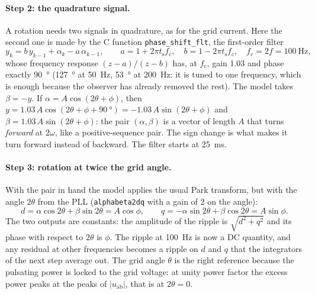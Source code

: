 \documentclass[11pt,a4paper]{scrartcl}
\newcommand{\ped}[1]{_{\mathrm{#1}}}
\newcommand{\code}[1]{\texttt{#1}}
\begin{document}
\begin{onehalfspace}
\paragraph{Step 2: the quadrature signal.}
A rotation needs two signals in quadrature, as for the grid current. Here the second one is made by the C function \code{phase\_shift\_flt}, the first-order filter
\begin{equation}
	y_k = b\, y_{k-1} + \alpha_k - a\, \alpha_{k-1}, \qquad a = 1 + 2\pi t\ped{s} f\ped{c}, \quad b = 1 - 2\pi t\ped{s} f\ped{c}, \quad f\ped{c} = 2 f = \SI{100}{\hertz},
	\label{eq:psf}
\end{equation}
whose frequency response $(z - a)/(z - b)$ has, at $f\ped{c}$, gain 1.03 and phase exactly \SI{+90}{\degree} (\SI{127}{\degree} at \SI{50}{\hertz}, \SI{53}{\degree} at \SI{200}{\hertz}: it is tuned to one frequency, which is enough because the observer has already removed the rest). The model takes $\beta = -y$. If $\alpha = A\cos(2\theta + \phi)$, then $y = 1.03\,A\cos(2\theta + \phi + \SI{90}{\degree}) = -1.03\, A\sin(2\theta + \phi)$ and $\beta = 1.03\, A\sin(2\theta + \phi)$: the pair $(\alpha, \beta)$ is a vector of length $A$ that turns \emph{forward} at $2\omega$, like a positive-sequence pair. The sign change is what makes it turn forward instead of backward. The filter starts at \SI{25}{\milli\second}.

\paragraph{Step 3: rotation at twice the grid angle.}
With the pair in hand the model applies the usual Park transform, but with the angle $2\theta$ from the PLL (\code{alphabeta2dq} with a gain of 2 on the angle):
\begin{equation}
	d = \alpha\cos 2\theta + \beta\sin 2\theta = A\cos\phi, \qquad q = -\alpha\sin 2\theta + \beta\cos 2\theta = A\sin\phi.
	\label{eq:park}
\end{equation}
The two outputs are constants: the amplitude of the ripple is $\sqrt{d^2 + q^2}$ and its phase with respect to $2\theta$ is $\phi$. The ripple at \SI{100}{\hertz} is now a DC quantity, and any residual at other frequencies becomes a ripple on $d$ and $q$ that the integrators of the next step average out. The grid angle $\theta$ is the right reference because the pulsating power is locked to the grid voltage: at unity power factor the excess power peaks at the peaks of $|u\ped{ab}|$, that is at $2\theta = 0$.


\end{onehalfspace}
\end{document}
